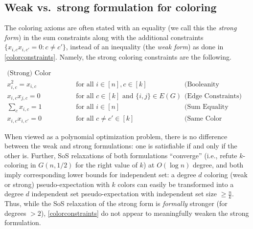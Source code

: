 \documentclass[10pt,a4paper]{article}
\theoremstyle{definition}
\newcommand{\numcolors}{k}
\begin{document}
\subsection{Weak vs.\ strong formulation for coloring} \label{sec:weak-vs-strong}
The coloring axioms are often stated with an equality (we call this the \emph{strong form}) in the sum constraints along with the additional constraints $\{x_{i,c} x_{i,c'} = 0 : c \ne c'\}$, instead of an inequality (the \emph{weak form}) as done in \cref{colorconstraints}. Namely, the strong coloring constraints are the following.
\begin{center}
\begin{subequations}
\boxed{
\begin{aligned}
\text{(Strong) Color Constraints} \\
x_{i,c}^2 = x_{i,c} &\text{ for all } i \in [n], c \in [k] & \ \text{(Booleanity Constraints)} \\
x_{i,c} x_{j,c} = 0 &\text{ for all } c\in [k] \text{ and } \{i,j\} \in E(G) & \ \text{(Edge Constraints)}  \\
\sum_{c} x_{i,c} = 1 &\text{ for all } i \in [n] & \ \text{(Sum Equality Constraints)} \\
x_{i,c} x_{i,c'} = 0 &\text{ for all } c \ne c' \in [k] & \ \text{(Same Color Constraints)}
\end{aligned}
}
\end{subequations}
\end{center}
When viewed as a polynomial optimization problem, there is no difference between the weak and strong formulations: one is satisfiable if and only if the other is. Further, SoS relaxations of both formulations ``converge'' (i.e., refute $k$-coloring in $G(n,1/2)$ for the right value of $k$) at $O(\log n)$ degree, and both imply corresponding lower bounds for independent set: a degree $d$ coloring (weak or strong) pseudo-expectation with $\numcolors$ colors can easily be transformed into a degree $d$ independent set pseudo-expectation with independent set size $\geq \frac{n}{\numcolors}$. Thus, while the SoS relaxation of the strong form is \emph{formally} stronger (for degrees $>2$), \cref{colorconstraints} do not appear to meaningfully weaken the strong formulation. 
\end{document}
